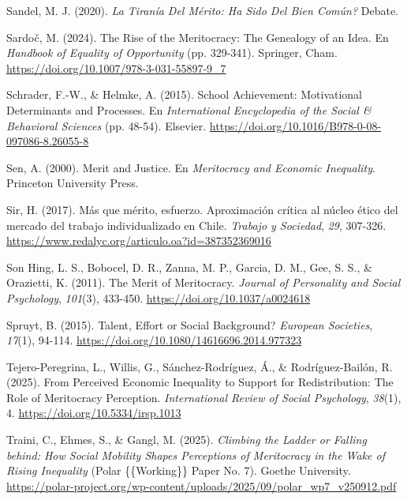 \documentclass[
  spanish,
  a4paper,
  oneside]{scrbook}
\newlength{\cslhangindent}
\newenvironment{CSLReferences}[2] %
 {\begin{list}{}{%
  \setlength{\itemindent}{0pt}
  \setlength{\leftmargin}{0pt}
  \setlength{\parsep}{0pt}
  \ifodd #1
   \setlength{\leftmargin}{\cslhangindent}
   \setlength{\itemindent}{-1\cslhangindent}
  \fi
  \setlength{\itemsep}{#2\baselineskip}}}
 {\end{list}}
\begin{document}
\begin{CSLReferences}{1}{0}
Sandel, M. J. (2020). \emph{La Tiranía Del Mérito:
 Ha Sido Del Bien Común?} Debate.

Sardoč, M. (2024). The {Rise} of the {Meritocracy}: {The Genealogy} of
an {Idea}. En \emph{Handbook of {Equality} of {Opportunity}} (pp.
329-341). Springer, Cham.
\url{https://doi.org/10.1007/978-3-031-55897-9_7}

Schrader, F.-W., \& Helmke, A. (2015). School {Achievement}:
{Motivational Determinants} and {Processes}. En \emph{International
{Encyclopedia} of the {Social} \& {Behavioral Sciences}} (pp. 48-54).
Elsevier. \url{https://doi.org/10.1016/B978-0-08-097086-8.26055-8}

Sen, A. (2000). Merit and Justice. En \emph{Meritocracy and {Economic
Inequality}}. Princeton University Press.

Sir, H. (2017). {Más que mérito, esfuerzo. Aproximación crítica al
núcleo ético del mercado del trabajo individualizado en Chile}.
\emph{Trabajo y Sociedad}, \emph{29}, 307-326.
\url{https://www.redalyc.org/articulo.oa?id=387352369016}

Son Hing, L. S., Bobocel, D. R., Zanna, M. P., Garcia, D. M., Gee, S.
S., \& Orazietti, K. (2011). The Merit of Meritocracy. \emph{Journal of
Personality and Social Psychology}, \emph{101}(3), 433-450.
\url{https://doi.org/10.1037/a0024618}

Spruyt, B. (2015). Talent, {Effort} or {Social Background}?
\emph{European Societies}, \emph{17}(1), 94-114.
\url{https://doi.org/10.1080/14616696.2014.977323}

Tejero-Peregrina, L., Willis, G., Sánchez-Rodríguez, Á., \&
Rodríguez-Bailón, R. (2025). From {Perceived Economic Inequality} to
{Support} for {Redistribution}: {The Role} of {Meritocracy Perception}.
\emph{International Review of Social Psychology}, \emph{38}(1), 4.
\url{https://doi.org/10.5334/irsp.1013}

Traini, C., Ehmes, S., \& Gangl, M. (2025). \emph{Climbing the Ladder or
Falling behind: {How} Social Mobility Shapes Perceptions of Meritocracy
in the Wake of Rising Inequality} (Polar \{\{Working\}\} Paper No. 7).
Goethe University.
\url{https://polar-project.org/wp-content/uploads/2025/09/polar_wp7_v250912.pdf}


\end{CSLReferences}
\end{document}
